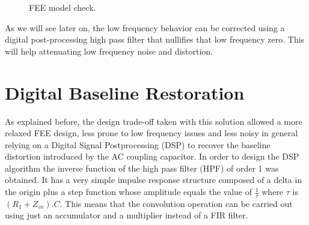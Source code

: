 \documentclass[a4paper,11pt]{report}
\begin{document}
\begin{figure}[!tbp]
  \centering
  \hfill
  \caption{FEE model check.}
  \label{fig:FEE_check}
\end{figure}

\par As we will see later on, the low frequency behavior can be corrected using a digital post-processing high pass filter that nullifies that low frequency zero. This will help attenuating low frequency noise and distortion.

\section{Digital Baseline Restoration}
\par As explained before, the design trade-off taken with this solution allowed a more relaxed FEE design, less prone to low frequency issues and less noisy in general relying on a Digital Signal Postprocessing (DSP) to recover the baseline distortion introduced by the AC coupling capacitor. In order to design the DSP algorithm the inverse function of the high pass filter (HPF) of order 1 was obtained. It has a very simple impulse response structure composed of a delta in the origin plus a step function whose amplitude equals the value of $\frac{1}{\tau}$ where $\tau$ is $(R_1+Z_{in}).C$. This means that the convolution operation can be carried out using just an accumulator and a multiplier instead of a FIR filter.     
\end{document}
